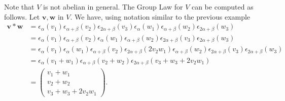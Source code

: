 															 Note that $V$ is not abelian in general. The Group Law for $V$ can be computed as follows. Let $\mathbf{v}, \mathbf{w}$ in $V$. We have, using notation similar to the previous example
															 \begin{align*}
															 \mathbf{v}*\mathbf{w}
															 &= 
															 \epsilon_\alpha(v_1)\epsilon_{\alpha+\beta}(v_2)\epsilon_{2\alpha+\beta}(v_3) \epsilon_\alpha(w_1)\epsilon_{\alpha+\beta}(w_2)\epsilon_{2\alpha+\beta}(w_3)\\
																 &= 
																 \epsilon_\alpha(v_1)\epsilon_{\alpha+\beta}(v_2) \epsilon_\alpha(w_1)\epsilon_{\alpha+\beta}(w_2)\epsilon_{2\alpha+\beta}(v_3)\epsilon_{2\alpha+\beta}(w_3)\\
																	 &= 
																	 \epsilon_\alpha(v_1) \epsilon_\alpha(w_1) \epsilon_{\alpha + \beta}(v_2)\epsilon_{2\alpha+\beta}(2v_2w_1)\epsilon_{\alpha+\beta}(w_2)\epsilon_{2\alpha+\beta}(v_3)\epsilon_{2\alpha+\beta}(w_3)\\
																		 &= 
																		 \epsilon_\alpha(v_1 + w_1) \epsilon_{\alpha + \beta}(v_2 + w_2)\epsilon_{2\alpha+\beta}(v_3 + w_3 + 2v_2w_1)\\
																			 &=
																			 \left(\begin{matrix}
																					 v_1 + w_1 \\
																					 v_2 + w_2 \\
																					 v_3 + w_3 + 2v_2w_1
																					 \end{matrix}\right).
																			 \end{align*}

